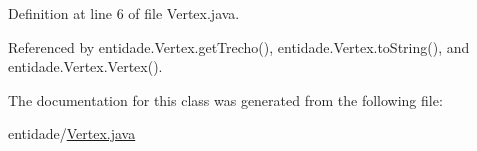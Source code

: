 Definition at line 6 of file Vertex.\+java.



Referenced by entidade.\+Vertex.\+get\+Trecho(), entidade.\+Vertex.\+to\+String(), and entidade.\+Vertex.\+Vertex().



The documentation for this class was generated from the following file\+:\begin{DoxyCompactItemize}
\item 
entidade/\hyperlink{Vertex_8java}{Vertex.\+java}\end{DoxyCompactItemize}
